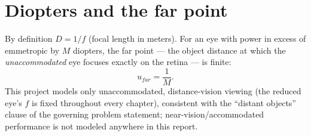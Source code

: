 \section{Diopters and the far point}

By definition $D = 1/f$ (focal length in meters). For an eye with power in excess of
emmetropic by $M$ diopters, the far point --- the object distance at which the
\emph{unaccommodated} eye focuses exactly on the retina --- is finite:
\begin{equation}
u_{far} = \frac{1}{M}.
\end{equation}
This project models only unaccommodated, distance-vision viewing (the reduced eye's
$f$ is fixed throughout every chapter), consistent with the ``distant objects'' clause
of the governing problem statement; near-vision/accommodated performance is not
modeled anywhere in this report.
